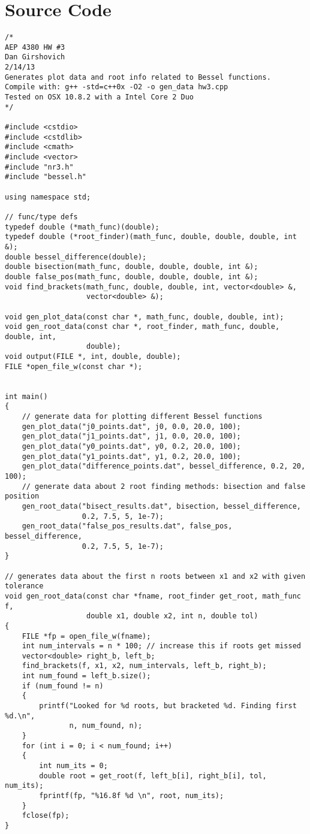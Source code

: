 \documentclass[12pt]{article}
\begin{document}
\section{Source Code}
\vspace{15mm}
\begin{lstlisting}
/*
AEP 4380 HW #3
Dan Girshovich
2/14/13
Generates plot data and root info related to Bessel functions.
Compile with: g++ -std=c++0x -O2 -o gen_data hw3.cpp
Tested on OSX 10.8.2 with a Intel Core 2 Duo
*/

#include <cstdio>
#include <cstdlib>
#include <cmath>
#include <vector>
#include "nr3.h"
#include "bessel.h"

using namespace std;

// func/type defs
typedef double (*math_func)(double);
typedef double (*root_finder)(math_func, double, double, double, int &);
double bessel_difference(double);
double bisection(math_func, double, double, double, int &);
double false_pos(math_func, double, double, double, int &);
void find_brackets(math_func, double, double, int, vector<double> &,
                   vector<double> &);

void gen_plot_data(const char *, math_func, double, double, int);
void gen_root_data(const char *, root_finder, math_func, double, double, int,
                   double);
void output(FILE *, int, double, double);
FILE *open_file_w(const char *);


int main()
{
    // generate data for plotting different Bessel functions
    gen_plot_data("j0_points.dat", j0, 0.0, 20.0, 100);
    gen_plot_data("j1_points.dat", j1, 0.0, 20.0, 100);
    gen_plot_data("y0_points.dat", y0, 0.2, 20.0, 100);
    gen_plot_data("y1_points.dat", y1, 0.2, 20.0, 100);
    gen_plot_data("difference_points.dat", bessel_difference, 0.2, 20, 100);
    // generate data about 2 root finding methods: bisection and false position
    gen_root_data("bisect_results.dat", bisection, bessel_difference,
                  0.2, 7.5, 5, 1e-7);
    gen_root_data("false_pos_results.dat", false_pos, bessel_difference,
                  0.2, 7.5, 5, 1e-7);
}

// generates data about the first n roots between x1 and x2 with given tolerance
void gen_root_data(const char *fname, root_finder get_root, math_func f,
                   double x1, double x2, int n, double tol)
{
    FILE *fp = open_file_w(fname);
    int num_intervals = n * 100; // increase this if roots get missed
    vector<double> right_b, left_b;
    find_brackets(f, x1, x2, num_intervals, left_b, right_b);
    int num_found = left_b.size();
    if (num_found != n)
    {
        printf("Looked for %d roots, but bracketed %d. Finding first %d.\n",
               n, num_found, n);
    }
    for (int i = 0; i < num_found; i++)
    {
        int num_its = 0;
        double root = get_root(f, left_b[i], right_b[i], tol, num_its);
        fprintf(fp, "%16.8f %d \n", root, num_its);
    }
    fclose(fp);
}


\end{lstlisting}
\end{document}
